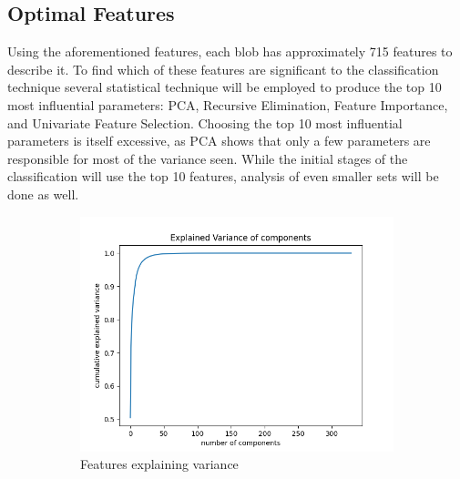 \documentclass[12pt]{article}
\renewcommand\theadfont{\small\bfseries}
\begin{document}
\subsection{Optimal Features}
Using the aforementioned features, each blob has approximately 715 features to describe it. To find which of these features are significant to the classification technique several statistical technique will be employed to produce the top 10 most influential parameters: PCA, Recursive Elimination, Feature Importance, and Univariate Feature Selection. Choosing the top 10 most influential parameters is itself excessive, as PCA shows that only a few parameters are responsible for most of the variance seen. While the initial stages of the classification will use the top 10 features, analysis of even smaller sets will be done as well.
\begin{figure}[h]
	\begin{subfigure}[h]{.48\textwidth}
		  \centering
		  \includegraphics[width=1\linewidth]{figures/pca.png}
		  \caption{Features explaining variance}
		  \label{fig:pca}
	\end{subfigure}
	\begin{subfigure}[h]{.32\textwidth}
	  \centering
	  	
		{
		\centering\settowidth{}
		\renewcommand\theadalign{cl}\renewcommand\cellalign{cl}
		\renewcommand\theadfont{\bfseries}
		\renewcommand\tabcolsep{4pt}\renewcommand\arraystretch{1.25}
		\footnotesize
		
}
\end{subfigure}
\end{figure}
\end{document}
